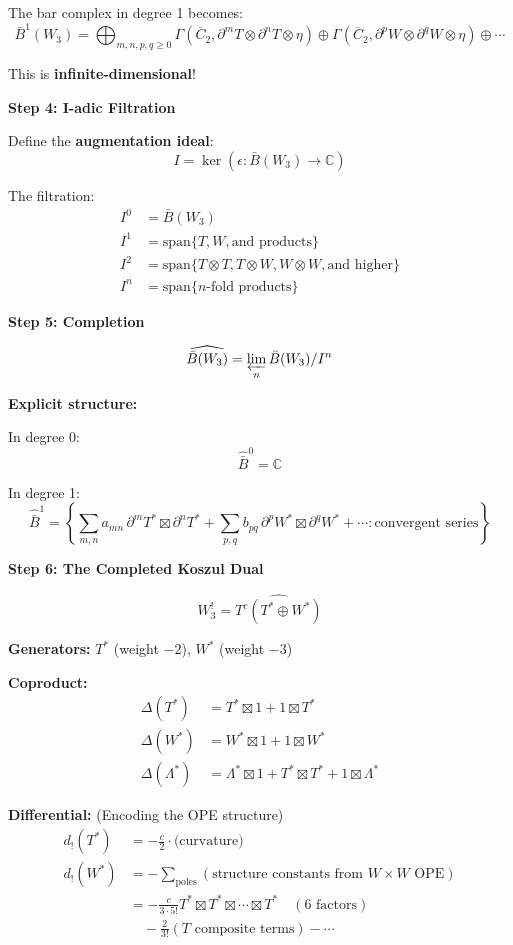 \begin{example}
The bar complex in degree 1 becomes:
$$\bar{B}^1(W_3) = \bigoplus_{m,n,p,q \geq 0} \Gamma(\overline{C}_2, \partial^m T \otimes \partial^n T \otimes \eta) \oplus \Gamma(\overline{C}_2, \partial^p W \otimes \partial^q W \otimes \eta) \oplus \cdots$$

This is \textbf{infinite-dimensional}!

\medskip
\noindent\textbf{Step 4: I-adic Filtration}

Define the \textbf{augmentation ideal}:
$$I = \ker(\epsilon: \bar{B}(W_3) \to \mathbb{C})$$

The filtration:
\begin{align*}
I^0 &= \bar{B}(W_3) \\
I^1 &= \text{span}\{T, W, \text{and products}\} \\
I^2 &= \text{span}\{T \otimes T, T \otimes W, W \otimes W, \text{and higher}\} \\
I^n &= \text{span}\{n\text{-fold products}\}
\end{align*}

\medskip
\noindent\textbf{Step 5: Completion}

$$\widehat{\bar{B}(W_3)} = \varprojlim_n \bar{B}(W_3)/I^n$$

\textbf{Explicit structure:}

In degree 0:
$$\widehat{\bar{B}}^0 = \mathbb{C}$$

In degree 1:
$$\widehat{\bar{B}}^1 = \left\{\sum_{m,n} a_{mn} \, \partial^m T^* \boxtimes \partial^n T^* + \sum_{p,q} b_{pq} \, \partial^p W^* \boxtimes \partial^q W^* + \cdots : \text{convergent series}\right\}$$

\medskip
\noindent\textbf{Step 6: The Completed Koszul Dual}

$$W_3^! = \widehat{T^c(T^* \oplus W^*)}$$

\textbf{Generators:} $T^*$ (weight $-2$), $W^*$ (weight $-3$)

\textbf{Coproduct:}
\begin{align*}
\Delta(T^*) &= T^* \boxtimes 1 + 1 \boxtimes T^* \\
\Delta(W^*) &= W^* \boxtimes 1 + 1 \boxtimes W^* \\
\Delta(\Lambda^*) &= \Lambda^* \boxtimes 1 + T^* \boxtimes T^* + 1 \boxtimes \Lambda^*
\end{align*}

\textbf{Differential:} (Encoding the OPE structure)
\begin{align*}
d_!(T^*) &= -\frac{c}{2} \cdot \text{(curvature)} \\
d_!(W^*) &= -\sum_{\text{poles}} (\text{structure constants from } W \times W \text{ OPE}) \\
&= -\frac{c}{3 \cdot 5!} T^* \boxtimes T^* \boxtimes \cdots \boxtimes T^* \quad (6 \text{ factors}) \\
&\quad - \frac{2}{3!} (T \text{ composite terms}) - \cdots
\end{align*}


\end{example}
